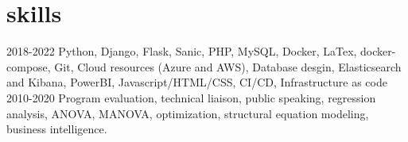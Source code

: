 \documentclass[]{twentysecondcv}
\begin{document}
\section{skills}
	\begin{twentyshort}
	\twentyitemshort
	{2018-2022}
	{Python, Django, Flask, Sanic, PHP, MySQL, Docker, LaTex, docker-compose, Git, Cloud resources (Azure and AWS), Database desgin, Elasticsearch and Kibana, PowerBI, Javascript/HTML/CSS, CI/CD, Infrastructure as code}
	\twentyitemshort
	{2010-2020}
	{Program evaluation, technical liaison, public speaking, regression analysis, ANOVA, MANOVA, optimization, structural equation modeling, business intelligence.}
	\end{twentyshort}

\end{document}
